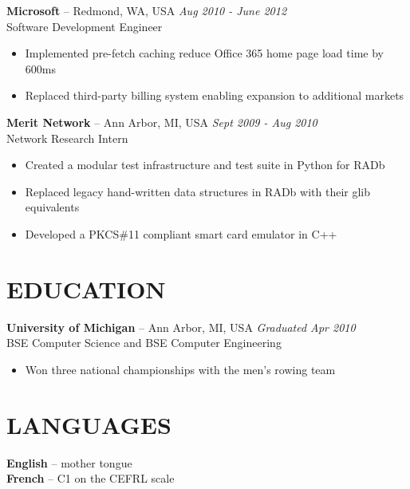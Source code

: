 \documentclass[]{rob-keim-resume}
\begin{document}
{\bf Microsoft} --  Redmond, WA, USA \hfill {\sl Aug 2010 - June 2012} \\
Software Development Engineer
\begin{itemize} \itemsep -2pt
	\item Implemented pre-fetch caching reduce Office 365 home page load time by 600ms
	\item Replaced third-party billing system enabling expansion to additional markets
\end{itemize}

{\bf Merit Network} --  Ann Arbor, MI, USA \hfill {\sl Sept 2009 - Aug 2010} \\
Network Research Intern
\begin{itemize} \itemsep -2pt
	\item Created a modular test infrastructure and test suite in Python for RADb
	\item Replaced legacy hand-written data structures in RADb with their glib equivalents
	\item Developed a PKCS\#11 compliant smart card emulator in C++
\end{itemize}


\section{EDUCATION} 

{\bf University of Michigan} -- Ann Arbor, MI, USA \hfill {\sl Graduated Apr 2010} \\
BSE Computer Science and BSE Computer Engineering
\begin{itemize} \itemsep -2pt
\item Won three national championships with the men's rowing team
\end{itemize}

\section{LANGUAGES}

{\bf English} -- mother tongue \\
{\bf French} -- C1 on the CEFRL scale
\end{document}
